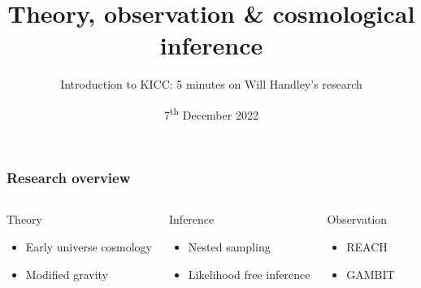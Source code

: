 \documentclass[aspectratio=169]{beamer}
\title{Theory, observation \& cosmological inference}
\subtitle{Introduction to KICC: 5 minutes on Will Handley's research}
\date{7\textsuperscript{th} December 2022}
\begin{document}
\begin{frame}
    \titlepage
\end{frame}

\begin{frame}
    \frametitle{Research overview}
    \begin{columns}
        \begin{block}{Theory}
            \begin{itemize}
                \item Early universe cosmology
                \item Modified gravity
            \end{itemize}
        \end{block}
        \begin{block}{Inference}
            \begin{itemize}
                \item Nested sampling
                \item Likelihood free inference
            \end{itemize}
        \end{block}
        \begin{block}{Observation}
            \begin{itemize}
                \item REACH
                \item GAMBIT
            \end{itemize}
        \end{block}
    \end{columns}
    

\end{frame}
\end{document}
